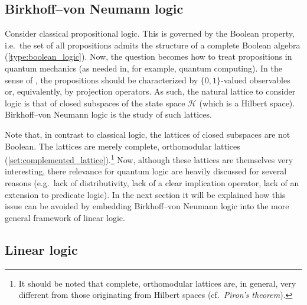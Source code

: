 \subsection{Birkhoff--von Neumann logic}

    Consider classical propositional logic. This is governed by the Boolean property, i.e.~the set of all propositions admits the structure of a complete Boolean algebra (\cref{type:boolean_logic}). Now, the question becomes how to treat propositions in quantum mechanics (as needed in, for example, quantum computing). In the sense of , the propositions should be characterized by $\{0,1\}$-valued observables or, equivalently, by projection operators. As such, the natural lattice to consider logic is that of closed subspaces of the state space $\mathcal{H}$ (which is a Hilbert space). Birkhoff--von Neumann logic is the study of such lattices.

    Note that, in contrast to classical logic, the lattices of closed subspaces are not Boolean. The lattices are merely complete, orthomodular lattices (\cref{set:complemented_lattice}).\footnote{It should be noted that complete, orthomodular lattices are, in general, very different from those originating from Hilbert spaces (cf.~\textit{Piron's theorem}).} Now, although these lattices are themselves very interesting, there relevance for quantum logic are heavily discussed for several reasons (e.g.~lack of distributivity, lack of a clear implication operator, lack of an extension to predicate logic). In the next section it will be explained how this issue can be avoided by embedding Birkhoff--von Neumann logic into the more general framework of linear logic.

\subsection{Linear logic}

